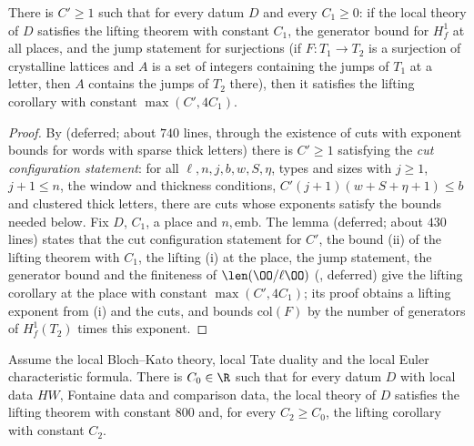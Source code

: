 \begin{theorem}\label{pf:linkN-sel:corE}
There is $C'\ge1$ such that for every datum $D$ and every $C_1\ge0$: if the local theory of $D$ satisfies the lifting theorem with constant $C_1$,
the generator bound for $H^1_f$ at all places, and the jump statement for surjections (if $F\colon T_1\to T_2$ is a surjection of crystalline
lattices and $A$ is a set of integers containing the jumps of $T_1$ at a letter, then $A$ contains the jumps of $T_2$ there), then it satisfies
the lifting corollary with constant $\max(C',4C_1)$.
\end{theorem}

\begin{proof}
By  (deferred; about $740$ lines, through the existence of cuts with
exponent bounds for words with sparse thick letters) there is $C'\ge1$ satisfying the \emph{cut configuration statement}: for all
$\ell,n,j,b,w,S,\eta$, types and sizes with $j\ge1$, $j+1\le n$, the window and thickness conditions, $C'(j+1)(w+S+\eta+1)\le b$ and clustered
thick letters, there are cuts whose exponents satisfy the bounds needed below. Fix $D$, $C_1$, a place and $n,\mathrm{emb}$. The lemma
 (deferred; about $430$ lines) states that the cut configuration statement for $C'$,
the bound (ii) of the lifting theorem with $C_1$, the lifting (i) at the place, the jump statement, the generator bound and the finiteness of
$\len(\OO/\ell\OO)$ (, deferred) give the lifting corollary at the place with
constant $\max(C',4C_1)$; its proof obtains a lifting exponent from (i) and the cuts, and bounds $\mathrm{col}(F)$ by the number of generators of
$H^1_f(T_2)$ times this exponent.
\end{proof}

\begin{theorem}\label{pf:linkN-sel:thmE}
Assume the local Bloch--Kato theory, local Tate duality and the local Euler characteristic formula. There is $C_0\in\R$ such that for every datum
$D$ with local data $HW$, Fontaine data and comparison data, the local theory of $D$ satisfies the lifting theorem with constant $800$ and, for every
$C_2\ge C_0$, the lifting corollary with constant $C_2$.
\end{theorem}

